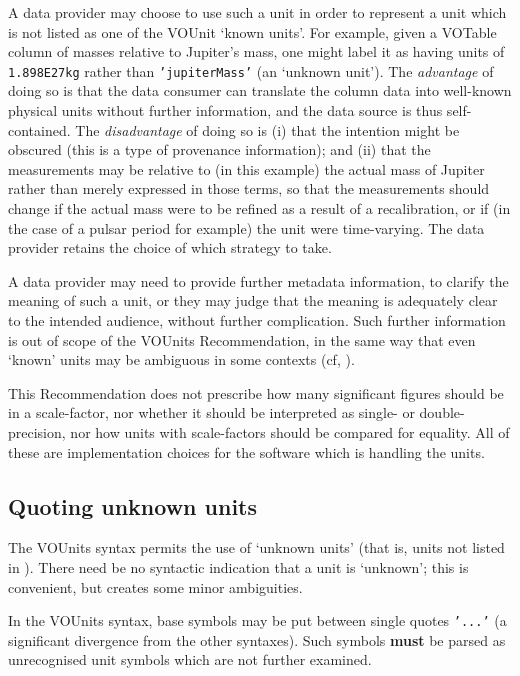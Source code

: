 \documentclass[11pt,a4paper]{ivoa}
\newcommand{\unit}[1]{\texttt{\small\color{orange}#1}}
\newcommand*\norm[1]{\textbf{\color{ivoacolor}#1}}
\begin{document}
A data provider may choose to use such a unit in order to represent a
unit which is not listed as one of the VOUnit `known units'.  For
example, given a VOTable column of masses relative to Jupiter's mass,
one might label it as having units of \unit{1.898E27kg} rather than
\unit{'jupiterMass'} (an `unknown unit').
The \emph{advantage} of doing so is that the data consumer can
translate the column data into well-known physical units without further
information, and the data source is thus self-contained.
The \emph{disadvantage} of doing so is (i) that the intention might be
obscured (this is a type of provenance information);
and (ii) that the measurements may be relative to (in this example)
the actual mass of Jupiter rather than merely expressed in those terms,
so that the measurements should change if the actual mass were to be
refined as a result of a recalibration, or if (in the case of a pulsar
period for example) the unit were time-varying.  The data provider retains the
choice of which strategy to take.

A data provider may need to provide further metadata information, to
clarify the meaning of such a unit, or they may judge that the meaning
is adequately clear to the intended audience, without further
complication.  Such further information is out of scope of the VOUnits
Recommendation, in the same way that even `known' units may be
ambiguous in some contexts (cf, ).

This Recommendation does not prescribe how many significant figures
should be in a scale-factor, nor whether it should be interpreted as
single- or double-precision, nor how units with scale-factors should
be compared for equality.  All of these are implementation choices for
the software which is handling the units.

\subsection{Quoting unknown units\label{sec:quoting}}

The VOUnits syntax permits the use of `unknown units' (that is, units not listed
in ).  There need be no syntactic indication that
a unit is `unknown'; this is convenient, but creates some minor
ambiguities.

In the VOUnits syntax, base symbols may be put between single
quotes \unit{'...'} (a significant divergence from the other
syntaxes).  Such symbols \norm{must} be parsed as
unrecognised unit symbols which are not further examined.
\end{document}
